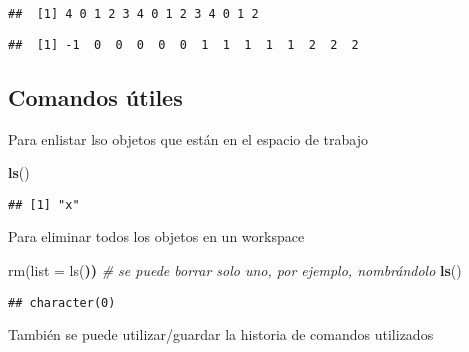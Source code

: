 \documentclass[]{article}
\newenvironment{Shaded}{\begin{snugshade}}{\end{snugshade}}
\newcommand{\KeywordTok}[1]{\textcolor[rgb]{0.13,0.29,0.53}{\textbf{{#1}}}}
\newcommand{\DecValTok}[1]{\textcolor[rgb]{0.00,0.00,0.81}{{#1}}}
\newcommand{\StringTok}[1]{\textcolor[rgb]{0.31,0.60,0.02}{{#1}}}
\newcommand{\CommentTok}[1]{\textcolor[rgb]{0.56,0.35,0.01}{\textit{{#1}}}}
\newcommand{\ErrorTok}[1]{\textbf{{#1}}}
\newcommand{\NormalTok}[1]{{#1}}
\begin{document}
\begin{Shaded}
\end{Shaded}

\begin{verbatim}
##  [1] 4 0 1 2 3 4 0 1 2 3 4 0 1 2
\end{verbatim}

\begin{Shaded}
\end{Shaded}

\begin{verbatim}
##  [1] -1  0  0  0  0  0  1  1  1  1  1  2  2  2
\end{verbatim}

\subsection{Comandos útiles}\label{comandos-utiles}

Para enlistar lso objetos que están en el espacio de trabajo

\begin{Shaded}
\begin{Highlighting}[]
\KeywordTok{ls}\NormalTok{()}
\end{Highlighting}
\end{Shaded}

\begin{verbatim}
## [1] "x"
\end{verbatim}

Para eliminar todos los objetos en un workspace

\begin{Shaded}
\begin{Highlighting}[]
\NormalTok{rm(list = ls(}\ErrorTok{))} \CommentTok{# se puede borrar solo uno, por ejemplo, nombrándolo}
\KeywordTok{ls}\NormalTok{()}
\end{Highlighting}
\end{Shaded}

\begin{verbatim}
## character(0)
\end{verbatim}

También se puede utilizar/guardar la historia de comandos utilizados
\end{document}
